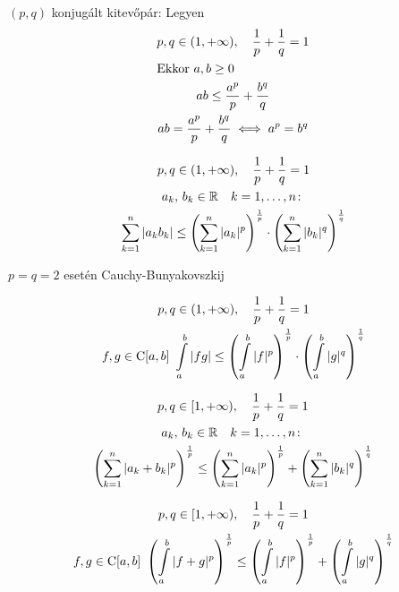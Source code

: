 \begin{te}
  $(p,q)$ konjugált kitevőpár: Legyen
\begin{gather*}
  p,q\in(1,+\infty),\quad\frac1p+ \frac1q=1\\
  \intertext{Ekkor $a,b\geq0$}
  ab\leq \frac{a^p}p+\frac{b^q}q\\
  ab = \frac{a^p}p+\frac{b^q}q\iff a^p=b^q  
\end{gather*}
\end{te}

\begin{te}
  \begin{gather*}
    p,q\in(1,+\infty),\quad\frac1p+ \frac1q=1\\
    a_k,\,b_k\in\mathbb{R}\quad k=1,\dotsc,n\colon\\
    \sum_{k=1}^n\vert a_kb_k\vert\leq\left(\sum_{k=1}^n\vert a_k\vert^p \right)^{\frac1p}\cdot \left(\sum_{k=1}^n\vert
     b_k\vert^q\right)^{\frac1q}
  \end{gather*}
\end{te}

\begin{megj} $p=q=2$ esetén Cauchy-Bunyakovszkij
\end{megj}

\begin{te}
  \begin{gather*}
    p,q\in(1,+\infty),\quad\frac1p+ \frac1q=1\\
    f,g\in\Folyt[a,b]\
    \Int_a^b\vert fg\vert\leq\left(\Int_a^b\vert f\vert^p\right)^{\frac1p}\cdot \left(\Int_a^b\vert
    g\vert^q\right)^{\frac1q}
  \end{gather*}
\end{te}


\begin{te}
  \begin{gather*}
    p,q\in[1,+\infty),\quad\frac1p+ \frac1q=1\\
    a_k,\,b_k\in\mathbb{R}\quad k=1,\dotsc,n\colon\\
    \left(\sum_{k=1}^n\vert a_k+b_k\vert^p \right)^{\frac1p} \leq
    \left(\sum_{k=1}^n\vert a_k\vert^p \right)^{\frac1p} + \left(\sum_{k=1}^n\vert b_k\vert^q\right)^{\frac1q}
  \end{gather*}
\end{te}


\begin{te}
  \begin{gather*}
    p,q\in[1,+\infty),\quad\frac1p+ \frac1q=1\\
    f,g\in\Folyt[a,b]\
    \left(\Int_a^b\vert f+g\vert^p\right)^{\frac1p}\leq
    \left(\Int_a^b\vert f\vert^p\right)^{\frac1p} +\left(\Int_a^b\vert g\vert^q\right)^{\frac1q}
  \end{gather*}
\end{te}

